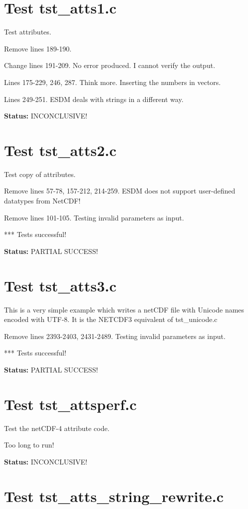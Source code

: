 \section{Test tst\_atts1.c}

Test attributes.

Remove lines 189-190.

Change lines 191-209. No error produced. I cannot verify the output.

Lines 175-229, 246, 287. Think more. Inserting the numbers in vectors.

Lines 249-251. ESDM deals with strings in a different way.

{\bf \large Status: } INCONCLUSIVE!

\section{Test tst\_atts2.c}

Test copy of attributes.

Remove lines 57-78, 157-212, 214-259. ESDM does not support user-defined datatypes from NetCDF!

Remove lines 101-105. Testing invalid parameters as input.

*** Tests successful!

{\bf \large Status: } PARTIAL SUCCESS!

\section{Test tst\_atts3.c}

This is a very simple example which writes a netCDF file with
Unicode names encoded with UTF-8. It is the NETCDF3 equivalent
of tst\_unicode.c

Remove lines 2393-2403, 2431-2489. Testing invalid parameters as input.

*** Tests successful!

{\bf \large Status: } PARTIAL SUCCESS!

\section{Test tst\_attsperf.c}

Test the netCDF-4 attribute code.

Too long to run!

{\bf \large Status: } INCONCLUSIVE!

\section{Test tst\_atts\_string\_rewrite.c}


